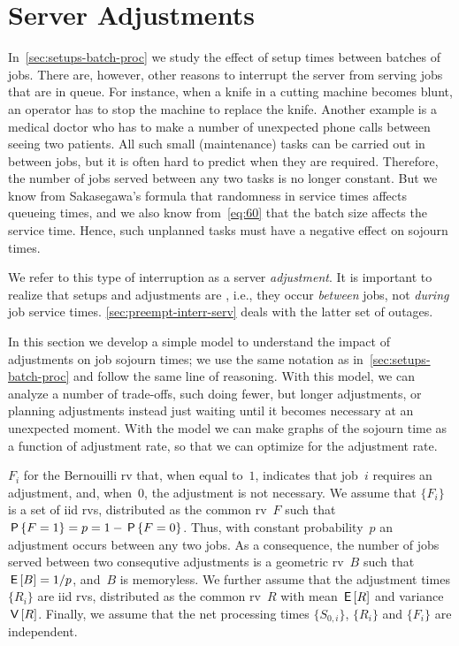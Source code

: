 \documentclass[stochastic-or.tex]{subfiles}
\begin{document}
\section{Server Adjustments}
\label{sec:non-preempt-interr}


In~\cref{sec:setups-batch-proc} we study the effect of setup times between batches of jobs.
There are, however, other reasons to interrupt the server from serving jobs that are in queue.
For instance,  when a knife in a cutting machine becomes blunt, an operator has to stop the machine to replace the knife.
Another example is a medical doctor who  has to make a number of unexpected phone calls between seeing two patients.
All such small (maintenance) tasks can be carried out in between jobs, but it is often hard to predict when they are required.
Therefore, the number of jobs served between any two tasks
is no longer constant.
But we know from Sakasegawa's formula that randomness in service times affects queueing times, and we also know from~\cref{eq:60} that the batch size affects the service time.
Hence, such unplanned tasks must have a negative effect on sojourn times.

We refer to this type of interruption as a server \emph{adjustment}.
It is important to realize that setups and adjustments are , i.e., they occur \emph{between} jobs, not \emph{during} job service times. \cref{sec:preempt-interr-serv} deals with the latter set of outages.


In this section we develop a simple model to understand the impact of adjustments on job sojourn times; we use the same notation as in~\cref{sec:setups-batch-proc} and follow the same line of reasoning.
With this model, we can analyze a number of trade-offs, such doing fewer, but longer adjustments, or planning adjustments instead just waiting until it becomes necessary at an unexpected moment. With the model we can make graphs of the sojourn time as a function of adjustment rate, so that we can optimize for the adjustment rate.


 $F_{i}$ for the Bernouilli rv that, when equal to~$1$, indicates that job~$i$ requires an adjustment, and, when~$0$, the adjustment is not necessary.
We assume that $\{F_{i}\}$ is a set of iid rvs, distributed as the common rv~$F$ such that $\P{F=1} = p = 1-\P{F=0}$.
Thus, with constant probability~$p$ an adjustment occurs between any two jobs.
As a consequence, the number of jobs served between two consequtive adjustments is a geometric rv~$B$ such that $\E{B} = 1/p$, and~$B$ is memoryless.
We further assume that the adjustment times $\{R_{i}\}$ are iid rvs, distributed as the common rv~$R$ with mean $\E R$ and variance $\V R$.
Finally, we assume that the net processing times $\{S_{0,i}\}$, $\{R_{i}\}$ and $\{F_{i}\}$ are independent.
\end{document}
